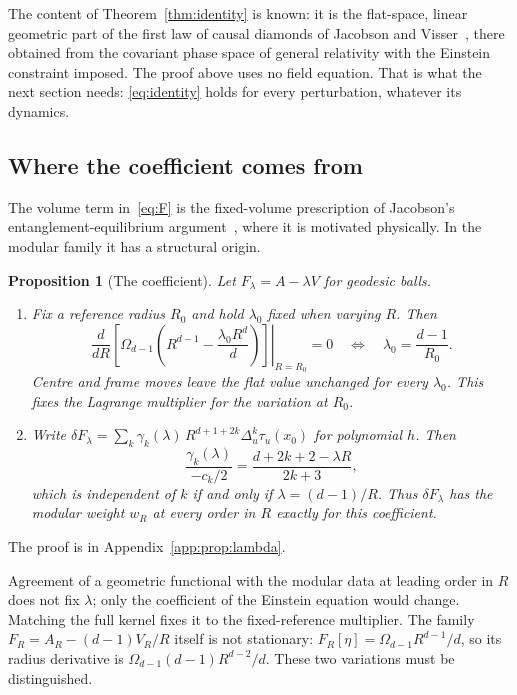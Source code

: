 \documentclass[12pt]{article}
\newtheorem{proposition}[theorem]{Proposition}
\theoremstyle{definition}
\theoremstyle{remark}
\begin{document}
The content of Theorem~\ref{thm:identity} is known: it is the flat-space, linear
geometric part of the first law of causal diamonds of Jacobson and
Visser~\cite{JacobsonVisser2019}, there obtained from the covariant phase space of general
relativity with the Einstein constraint imposed. The proof above uses no field equation.
That is what the next section needs: \eqref{eq:identity} holds for every perturbation,
whatever its dynamics.

\subsection{Where the coefficient comes from}\label{subsec:lambda}

The volume term in~\eqref{eq:F} is the fixed-volume prescription of Jacobson's
entanglement-equilibrium argument~\cite{Jacobson2016}, where it is motivated physically.
In the modular family it has a structural origin.

\begin{proposition}[The coefficient]\label{prop:lambda}
Let \(F_\lambda=A-\lambda V\) for geodesic balls.
\begin{enumerate}[label=(\alph*),leftmargin=2em,itemsep=1pt]
\item Fix a reference radius \(R_0\) and hold \(\lambda_0\) fixed when varying \(R\).
Then
\[
\left.\frac{d}{dR}\left[\Omega_{d-1}
 \left(R^{d-1}-\frac{\lambda_0R^d}{d}\right)\right]\right|_{R=R_0}=0
\quad\Longleftrightarrow\quad \lambda_0=\frac{d-1}{R_0}.
\]
Centre and frame moves leave the flat value unchanged for every \(\lambda_0\).
This fixes the Lagrange multiplier for the variation at \(R_0\).
\item Write \(\delta F_\lambda=\sum_k\gamma_k(\lambda)\,R^{d+1+2k}\Delta_u^k\tau_u(x_0)\) for
polynomial \(h\). Then
\[
\frac{\gamma_k(\lambda)}{-c_k/2}=\frac{d+2k+2-\lambda R}{2k+3},
\]
which is independent of \(k\) if and only if \(\lambda=(d-1)/R\). Thus \(\delta F_\lambda\)
has the modular weight \(w_R\) at every order in \(R\) exactly for this coefficient.
\end{enumerate}
\end{proposition}

The proof is in Appendix~\ref{app:prop:lambda}.


Agreement of a geometric functional with the modular data at leading order in \(R\) does
not fix \(\lambda\); only the coefficient of the Einstein equation would change. Matching the full kernel fixes it to the fixed-reference multiplier.
The family \(F_R=A_R-(d-1)V_R/R\) itself is not stationary:
\(F_R[\eta]=\Omega_{d-1}R^{d-1}/d\), so its radius derivative is
\(\Omega_{d-1}(d-1)R^{d-2}/d\). These two variations must be distinguished.
\end{document}
